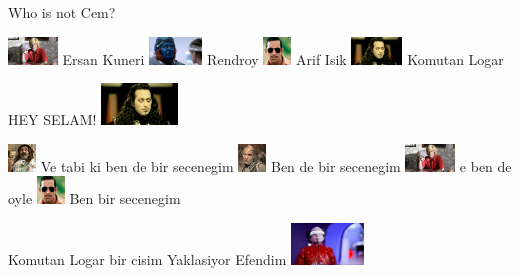\documentclass{exam}
\begin{document}
\begin{questions}
\question Who is not Cem?\newline
\begin{oneparchoices}
\choice \includegraphics[height=2em]{ersan.jpg}
Ersan Kuneri
\CorrectChoice \includegraphics[height=2em]{rendroy2.jpg}
Rendroy
\choice \includegraphics[height=2em]{arifisik.jpg}
Arif Isik
\choice \includegraphics[height=2em]{komutanlogar.jpeg}
Komutan Logar
\end{oneparchoices}
\question HEY SELAM!\newline
\includegraphics[height=3em]{komutanlogar.jpeg} \newline
\begin{oneparchoices}
\choice \includegraphics[height=2em]{faruk.jpg}
Ve tabi ki ben de bir secenegim
\CorrectChoice \includegraphics[height=2em]{216.jpg}
Ben de bir secenegim
\choice \includegraphics[height=2em]{ersan.jpg}
e ben de oyle
\choice \includegraphics[height=2em]{arifisik.jpg}
Ben bir secenegim
\end{oneparchoices}
\question Komutan Logar bir cisim Yaklasiyor Efendim\newline
\includegraphics[height=3em]{tihulu.jpeg} \newline

\end{questions}
\end{document}
